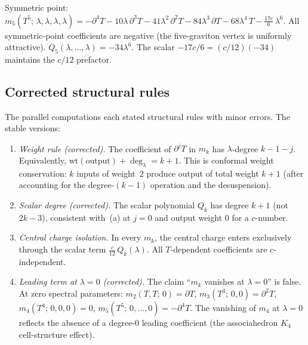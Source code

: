 \documentclass[11pt]{article}
\begin{document}
Symmetric point:
$m_5(T^5;\,\lambda,\lambda,\lambda,\lambda)
= -\partial^4 T
- 10\lambda\,\partial^3 T
- 41\lambda^2\,\partial^2 T
- 84\lambda^3\,\partial T
- 68\lambda^4\, T
- \tfrac{17c}{6}\,\lambda^6$.
All symmetric-point coefficients are negative (the
five-graviton vertex is uniformly attractive).
$Q_5(\lambda,\ldots,\lambda) = -34\lambda^6$.
The scalar $-17c/6 = (c/12)(-34)$ maintains the
$c/12$ prefactor.

\subsection{Corrected structural rules}

The parallel computations each stated structural rules
with minor errors.  The stable versions:

\begin{enumerate}[label=\textup{(\alph*)},nosep]
\item \textit{Weight rule (corrected).}
  The coefficient of $\partial^j T$ in $m_k$ has
  $\lambda$-degree $k - 1 - j$.  Equivalently,
  $\mathrm{wt}(\text{output}) + \deg_\lambda = k + 1$.
  This is conformal weight conservation:
  $k$ inputs of weight~$2$ produce output of total
  weight $k + 1$ (after accounting for the degree-$(k-1)$
  operation and the desuspension).

\item \textit{Scalar degree (corrected).}
  The scalar polynomial $Q_k$ has degree $k + 1$
  (not $2k - 3$), consistent with~(a) at $j = 0$
  and output weight $0$ for a $c$-number.

\item \textit{Central charge isolation.}
  In every $m_k$, the central charge enters exclusively through
  the scalar term $\tfrac{c}{12}\,Q_k(\lambda)$.  All
  $T$-dependent coefficients are $c$-independent.

\item \textit{Leading term at $\lambda = 0$ (corrected).}
  The claim ``$m_k$ vanishes at $\lambda = 0$'' is false.
  At zero spectral parameters:
  $m_2(T,T;\,0) = \partial T$,
  $m_3(T^3;\,0,0) = \partial^2 T$,
  $m_4(T^4;\,0,0,0) = 0$,
  $m_5(T^5;\,0,\ldots,0) = -\partial^4 T$.
  The vanishing of $m_4$ at $\lambda = 0$ reflects the absence of
  a degree-$0$ leading coefficient (the associahedron $K_4$
  cell-structure effect).
\end{enumerate}
\end{document}
